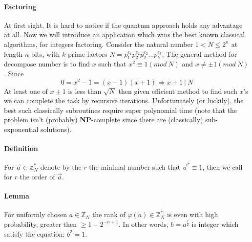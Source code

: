 \paragraph{Factoring} At first sight, It is hard to notice if the quantum approach holds any advantage at all. Now we will introduce an application which wins the best known classical algorithms, for integers factoring.
Consider the natural number \( 1 < N  \le 2^n \) at length \( n \) bits, with \(k\) prime factors \( N = p_{1}^{e_1}p_{2}^{e_2}p_{2}^{e_2}...p_{k}^{e_k} \). The general method for decompose number is to find \(x\) such that \( x^2 \equiv 1 \left( mod \ N \right) \) and  \( x\neq \pm 1  \left( mod \ N \right) \). Since \[0 = x^2 - 1 = \left(x-1\right)\left(x+1\right) \Rightarrow x+1 \ | \  N \] At least one of \( x \pm 1 \) is less than \( \sqrt{N} \)  then given efficient method to find such \(x\)'s we can complete the task by   recursive iterations. Unfortunately (or luckily), the best such classically subroutines require super polynomial time (note that the problem isn't (probably) \textbf{NP}-complete since there are (classically) sub-exponential solutions).
\paragraph{Definition} For \( \vec{a} \in \mathbb{Z}^{*}_{N} \) denote by the \(r\) the minimal number such that \( \vec{a}^{r} \equiv 1 \), then we call for \(r\) the order of \(\vec{a} \). 
\paragraph{Lemma} For uniformly chosen \( a \in \mathbb{Z}_N \) the rank of \( \varphi(a) \in \mathbb{Z}^{*}_{N} \) is even with high probability, greater then \( \ge 1 - 2^{-n+1}  \). 
In other words, \( b = a^\frac{r}{2} \) is integer which satisfy the equation: \(b ^2 = 1\).   
